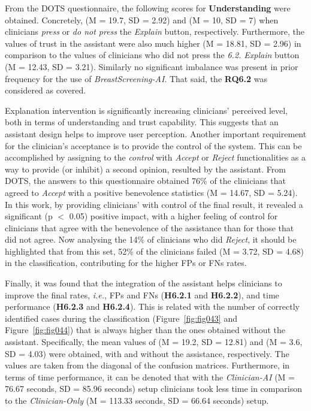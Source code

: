 From the \ac{DOTS} questionnaire, the following scores for {\bf Understanding} were obtained.
Concretely, (M = 19.7, SD = 2.92) and (M = 10, SD = 7) when clinicians {\it press} or {\it do not press} the  {\it Explain} button, respectively.
Furthermore, the values of trust in the assistant were also much higher (M = 18.81, SD = 2.96) in comparison to the values of clinicians who did not press the {\it 6.2. Explain} button (M = 12.43, SD = 3.21).
Similarly no significant imbalance was present in prior frequency for the use of {\it BreastScreening-AI}.
That said, the {\bf RQ6.2} was considered as covered.

Explanation intervention is significantly increasing clinicians’ perceived level, both in terms of understanding and trust capability.
This suggests that an assistant design helps to improve user perception.
Another important requirement for the clinician's acceptance is to provide the control of the system.
This can be accomplished by assigning to the {\it control} with {\it Accept} or {\it Reject} functionalities as a way to provide (or inhibit) a second opinion, resulted by the assistant.
From \ac{DOTS}, the answers to this questionnaire obtained 76\% of the clinicians that agreed to {\it Accept} with a positive benevolence statistics (M = 14.67, SD = 5.24).
In this work, by providing clinicians' with control of the final result, it revealed a significant (p $<$ 0.05) positive impact, with a higher feeling of control for clinicians that agree with the benevolence of the assistance than for those that did not agree.
Now analysing the 14\% of clinicians who did {\it Reject}, it should be highlighted that from this set, 52\% of the clinicians failed (M = 3.72, SD = 4.68) in the classification, contributing for the higher \acp{FP} or \acp{FN} rates.

Finally, it was found that the integration of the assistant helps clinicians to improve the final rates, {\it i.e.}, \acp{FP} and \acp{FN} ({\bf H6.2.1} and {\bf H6.2.2}), and time performance ({\bf H6.2.3} and {\bf H6.2.4}).
This is related with the number of correctly identified cases during the classification (Figure~\ref{fig:fig043} and Figure~\ref{fig:fig044}) that is always higher than the ones obtained without the assistant.
Specifically, the mean values of (M = 19.2, SD = 12.81) and (M = 3.6, SD = 4.03) were obtained, with and without the assistance, respectively.
The values are taken from the diagonal of the confusion matrices.
Furthermore, in terms of time performance, it can be denoted that with the {\it Clinician-AI} (M = 76.67 seconds, SD = 85.96 seconds) setup clinicians took less time in comparison to the {\it Clinician-Only} (M = 113.33 seconds, SD = 66.64 seconds) setup.

